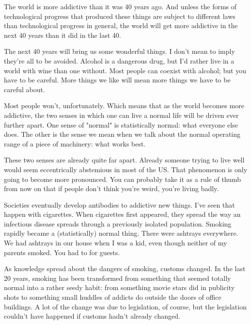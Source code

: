 The world is more addictive than it was
                  40 years ago. And unless the forms of technological progress
                  that produced these things are subject to different laws than
                  technological progress in general, the world will get more
                  addictive in the next 40 years than it did in the last 40.

The
                  next 40 years will bring us some wonderful things. I don't
                  mean to imply they're all to be avoided. Alcohol is a
                  dangerous drug, but I'd rather live in a world with wine than
                  one without. Most people can coexist with alcohol; but you
                  have to be careful. More things we like will mean more things
                  we have to be careful about.

Most people won't,
                  unfortunately. Which means that as the world becomes more
                  addictive, the two senses in which one can live a normal life
                  will be driven ever further apart. One sense of "normal" is
                  statistically normal: what everyone else does. The other is
                  the sense we mean when we talk about the normal operating
                  range of a piece of machinery: what works best.

These
                  two senses are already quite far apart. Already someone trying
                  to live well would seem eccentrically abstemious in most of
                  the US. That phenomenon is only going to become more
                  pronounced. You can probably take it as a rule of thumb from
                  now on that if people don't think you're weird, you're living
                  badly.

Societies eventually develop antibodies to
                  addictive new things. I've seen that happen with cigarettes.
                  When cigarettes first appeared, they spread the way an
                  infectious disease spreads through a previously isolated
                  population. Smoking rapidly became a (statistically) normal
                  thing. There were ashtrays everywhere. We had ashtrays in our
                  house when I was a kid, even though neither of my parents
                  smoked. You had to for guests.

As knowledge spread
                  about the dangers of smoking, customs changed. In the last 20
                  years, smoking has been transformed from something that seemed
                  totally normal into a rather seedy habit: from something movie
                  stars did in publicity shots to something small huddles of
                  addicts do outside the doors of office buildings. A lot of the
                  change was due to legislation, of course, but the legislation
                  couldn't have happened if customs hadn't already changed.

